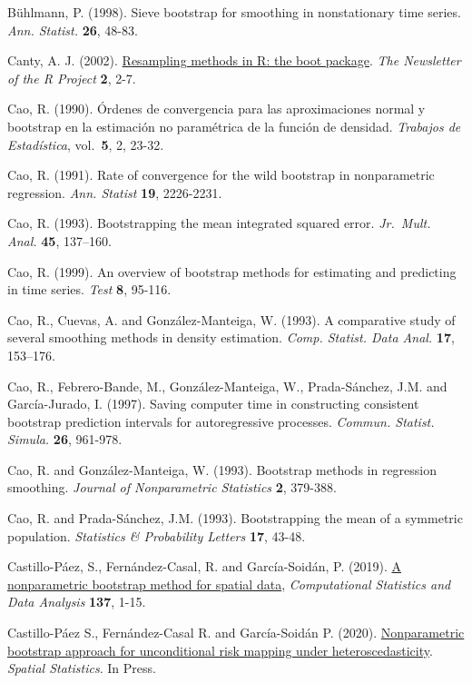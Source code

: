 \documentclass[
]{book}
\theoremstyle{break}
\theoremstyle{definition}
\theoremstyle{definition}
\theoremstyle{definition}
\theoremstyle{remark}
\begin{document}
Bühlmann, P. (1998). Sieve bootstrap for smoothing in nonstationary time
series. \emph{Ann. Statist.} \textbf{26}, 48-83.

Canty, A. J. (2002). \href{http://cran.fhcrc.org/doc/Rnews/Rnews_2002-3.pdf}{Resampling methods in R: the boot package}.
\emph{The Newsletter of the R Project} \textbf{2}, 2-7.

Cao, R. (1990). Órdenes de convergencia para las aproximaciones normal y
bootstrap en la estimación no paramétrica de la función de densidad.
\emph{Trabajos de Estadística}, vol.~\textbf{5}, 2, 23-32.

Cao, R. (1991). Rate of convergence for the wild bootstrap in
nonparametric regression. \emph{Ann. Statist} \textbf{19}, 2226-2231.

Cao, R. (1993). Bootstrapping the mean integrated squared error.
\emph{Jr.~Mult. Anal.} \textbf{45}, 137--160.

Cao, R. (1999). An overview of bootstrap methods for estimating and
predicting in time series. \emph{Test} \textbf{8}, 95-116.

Cao, R., Cuevas, A. and González-Manteiga, W. (1993). A comparative
study of several smoothing methods in density estimation.
\emph{Comp. Statist. Data Anal.} \textbf{17}, 153--176.

Cao, R., Febrero-Bande, M., González-Manteiga, W., Prada-Sánchez, J.M.
and García-Jurado, I. (1997). Saving computer time in constructing
consistent bootstrap prediction intervals for autoregressive processes.
\emph{Commun. Statist. Simula.} \textbf{26}, 961-978.

Cao, R. and González-Manteiga, W. (1993). Bootstrap methods in
regression smoothing. \emph{Journal of Nonparametric Statistics} \textbf{2},
379-388.

Cao, R. and Prada-Sánchez, J.M. (1993). Bootstrapping the mean of a
symmetric population. \emph{Statistics \& Probability Letters} \textbf{17}, 43-48.

Castillo-Páez, S., Fernández-Casal, R. and García-Soidán, P. (2019).
\href{https://www.sciencedirect.com/science/article/pii/S0167947319300325?via\%3Dihub}{A nonparametric bootstrap method for spatial data},
\emph{Computational Statistics and Data Analysis} \textbf{137}, 1-15.

Castillo-Páez S., Fernández-Casal R. and García-Soidán P. (2020).
\href{https://doi.org/10.1016/j.spasta.2019.100389}{Nonparametric bootstrap approach for unconditional risk mapping under heteroscedasticity}.
\emph{Spatial Statistics}. In Press.
\end{document}
